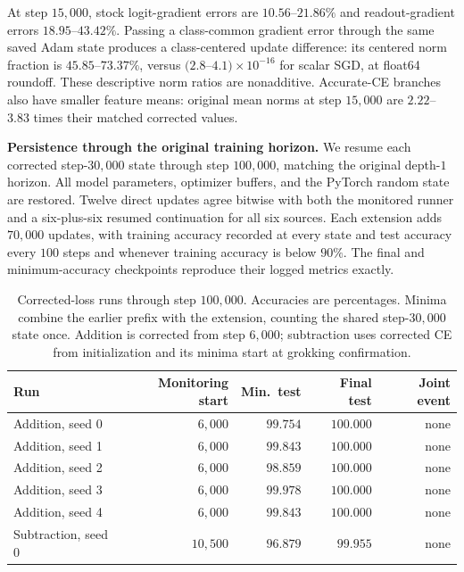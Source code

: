 At step $15{,}000$, stock logit-gradient errors are $10.56$--$21.86\%$ and readout-gradient errors $18.95$--$43.42\%$. Passing a class-common gradient error through the same saved Adam state produces a class-centered update difference: its centered norm fraction is $45.85$--$73.37\%$, versus $(2.8$--$4.1)\times10^{-16}$ for scalar SGD, at float64 roundoff. These descriptive norm ratios are nonadditive. Accurate-CE branches also have smaller feature means: original mean norms at step $15{,}000$ are $2.22$--$3.83$ times their matched corrected values.

\textbf{Persistence through the original training horizon.} We resume each corrected step-$30{,}000$ state through step $100{,}000$, matching the original depth-$1$ horizon. All model parameters, optimizer buffers, and the PyTorch random state are restored. Twelve direct updates agree bitwise with both the monitored runner and a six-plus-six resumed continuation for all six sources. Each extension adds $70{,}000$ updates, with training accuracy recorded at every state and test accuracy every $100$ steps and whenever training accuracy is below $90\%$. The final and minimum-accuracy checkpoints reproduce their logged metrics exactly.

\begin{table}[htbp]
\centering\small
\caption{Corrected-loss runs through step $100{,}000$. Accuracies are percentages. Minima combine the earlier prefix with the extension, counting the shared step-$30{,}000$ state once. Addition is corrected from step $6{,}000$; subtraction uses corrected CE from initialization and its minima start at grokking confirmation.}
\label{tab:long-horizon}
\begin{tabular}{lrrrr}
\toprule
Run & Monitoring start & Min.\ test & Final test & Joint event \\
\midrule
Addition, seed 0 & $6{,}000$ & $99.754$ & $100.000$ & none \\
Addition, seed 1 & $6{,}000$ & $99.843$ & $100.000$ & none \\
Addition, seed 2 & $6{,}000$ & $98.859$ & $100.000$ & none \\
Addition, seed 3 & $6{,}000$ & $99.978$ & $100.000$ & none \\
Addition, seed 4 & $6{,}000$ & $99.843$ & $100.000$ & none \\
Subtraction, seed 0 & $10{,}500$ & $96.879$ & $99.955$ & none \\
\bottomrule
\end{tabular}
\end{table}

